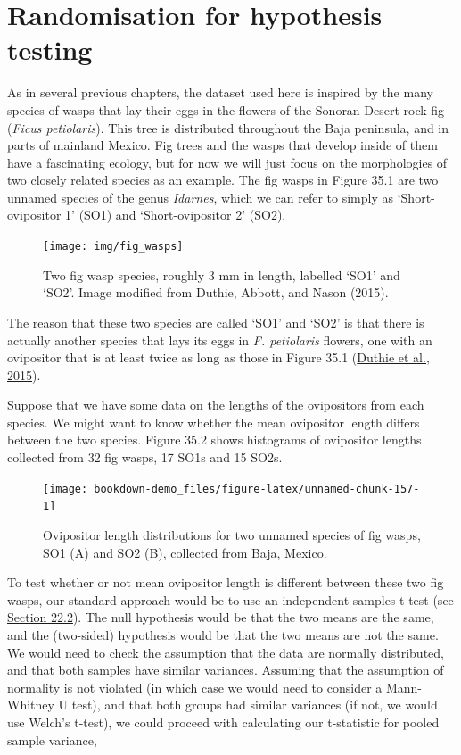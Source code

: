 \documentclass[
  openany]{krantz}
\begin{document}
\hypertarget{randomisation-for-hypothesis-testing}{%
\section{Randomisation for hypothesis testing}\label{randomisation-for-hypothesis-testing}}

As in several previous chapters, the dataset used here is inspired by the many species of wasps that lay their eggs in the flowers of the Sonoran Desert rock fig (\emph{Ficus petiolaris}).
This tree is distributed throughout the Baja peninsula, and in parts of mainland Mexico.
Fig trees and the wasps that develop inside of them have a fascinating ecology, but for now we will just focus on the morphologies of two closely related species as an example.
The fig wasps in Figure 35.1 are two unnamed species of the genus \emph{Idarnes}, which we can refer to simply as `Short-ovipositor 1' (SO1) and `Short-ovipositor 2' (SO2).

\begin{figure}
\texttt{[image: img/fig\_wasps]} \caption{Two fig wasp species, roughly 3 mm in length, labelled `SO1' and `SO2'. Image modified from Duthie, Abbott, and Nason (2015).}\label{fig:unnamed-chunk-156}
\end{figure}

The reason that these two species are called `SO1' and `SO2' is that there is actually another species that lays its eggs in \emph{F. petiolaris} flowers, one with an ovipositor that is at least twice as long as those in Figure 35.1 (\protect\hyperlink{ref-Duthie2015b}{Duthie et al., 2015}).

Suppose that we have some data on the lengths of the ovipositors from each species.
We might want to know whether the mean ovipositor length differs between the two species. Figure 35.2 shows histograms of ovipositor lengths collected from 32 fig wasps, 17 SO1s and 15 SO2s.

\begin{figure}
\texttt{[image: bookdown-demo\_files/figure-latex/unnamed-chunk-157-1]} \caption{Ovipositor length distributions for two unnamed species of fig wasps, SO1 (A) and SO2 (B), collected from Baja, Mexico.}\label{fig:unnamed-chunk-157}
\end{figure}

To test whether or not mean ovipositor length is different between these two fig wasps, our standard approach would be to use an independent samples t-test (see \protect\hyperlink{independent-samples-t-test}{Section 22.2}).
The null hypothesis would be that the two means are the same, and the  (two-sided) hypothesis would be that the two means are not the same.
We would need to check the assumption that the data are normally distributed, and that both samples have similar variances.
Assuming that the assumption of normality is not violated (in which case we would need to consider a Mann-Whitney U test), and that both groups had similar variances (if not, we would use Welch's t-test), we could proceed with calculating our t-statistic for pooled sample variance,
\end{document}
